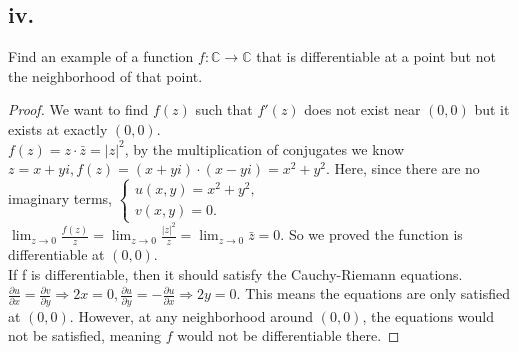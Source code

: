 \documentclass{article}
\begin{document}
\subsection*{iv.}
Find an example of a function $f: \mathbb{C \rightarrow \mathbb C}$ that is differentiable at a point but not the neighborhood of that point. 

\begin{proof}
    We want to find $f(z)$ such that $f'(z)$ does not exist near $(0,0)$ but it exists at exactly $(0,0).$  \\
    $f(z)=z\cdot\bar{z} = |z|^2$, by the multiplication of conjugates we know $z=x+yi,f(z)=(x+yi)\cdot (x-yi)=x^2+y^2$. Here, since there are no imaginary terms, 
    $\begin{cases}
        u(x,y)=x^2+y^2,\\
        v(x,y)=0.
    \end{cases}$
    $\lim_{z \rightarrow 0}\frac{f(z)}{z}=\lim_{z \rightarrow 0}\frac{|z|^2}{z}=\lim_{z \rightarrow 0}\bar{z}=0.$ So we proved the function is differentiable at $(0,0).$ \\
    If f is differentiable, then it should satisfy the Cauchy-Riemann equations. $\frac{\partial u}{\partial x}=\frac{\partial v}{\partial y} \Rightarrow 2x=0, \frac{\partial u}{\partial y }= -\frac{\partial u}{\partial x} \Rightarrow2y=0 $. This means the equations are only satisfied at $(0,0).$ However, at any neighborhood around $(0,0)$, the equations would not be satisfied, meaning $f$ would not be differentiable there. 
\end{proof}

\clearpage
\end{document}

